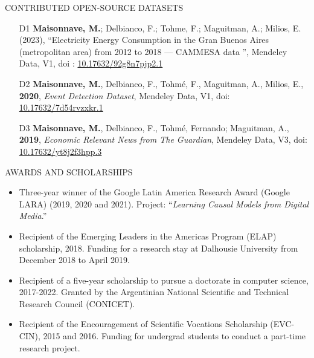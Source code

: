 \documentclass{resume} %
\begin{document}
\newpage
\begin{rSection}{CONTRIBUTED OPEN-SOURCE DATASETS}
\begin{itemize}
    
\item[D1] \textbf{Maisonnave, M.}; Delbianco, F.; Tohme, F.; Maguitman, A.; Milios, E. (2023), “Electricity Energy Consumption in the Gran Buenos Aires (metropolitan area) from 2012 to 2018 --- CAMMESA data ”, Mendeley Data, V1, doi  : \href{https://dx.doi.org/10.17632/92g8n7pjp2.1}{10.17632/92g8n7pjp2.1}

\item[D2] \textbf{Maisonnave, M.}, Delbianco, F., Tohmé, F., Maguitman, A., Milios, E., \textbf{2020}, \textit{Event Detection Dataset}, Mendeley Data, V1, doi: \href{https://dx.doi.org/10.17632/7d54rvzxkr.1}{10.17632/7d54rvzxkr.1}

\item[D3]  \textbf{Maisonnave, M.}, Delbianco, F., Tohmé, Fernando; Maguitman, A., \textbf{2019}, \textit{Economic Relevant News from The Guardian}, Mendeley Data, V3, doi:  \href{https://dx.doi.org/10.17632/yt8j2f3hpp.3}{10.17632/yt8j2f3hpp.3}
\end{itemize}

\end{rSection}


\begin{rSection}{AWARDS AND SCHOLARSHIPS} 
\begin{itemize}
    \item Three-year winner of the Google Latin America Research Award (Google LARA) (2019, 2020 and 2021). Project: ``\textit{Learning Causal Models from Digital Media}.''
    \item Recipient of the Emerging Leaders in the Americas Program (ELAP) scholarship, 2018. Funding for a research stay at Dalhousie University from December 2018 to April 2019.
    \item Recipient of a five-year scholarship to pursue a doctorate in computer science, 2017-2022. Granted by the Argentinian National Scientific and Technical Research Council (CONICET).
    \item Recipient of the Encouragement of Scientific Vocations Scholarship (EVC-CIN), 2015 and 2016. Funding for undergrad students to conduct a part-time research project.
\end{itemize}

\end{rSection}


\end{document}
